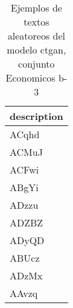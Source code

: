 \begin{table}[H]
\centering
\fontsize{8}{14}\selectfont
\caption{Ejemplos de textos aleatoreos del modelo ctgan, conjunto Economicos b-3}
\label{table-sample10-economicos-b-3-ctgan-text}
\begin{tabular}{|m{50em}|}
\hline
\rowcolor[gray]{0.8}
description \\
\hline ACqhd \\
\hline ACMuJ \\
\hline ACFwi \\
\hline ABgYi \\
\hline ADzzu \\
\hline ADZBZ \\
\hline ADyQD \\
\hline ABUcz \\
\hline ADzMx \\
\hline AAvzq \\
\hline
\end{tabular}
\end{table}
